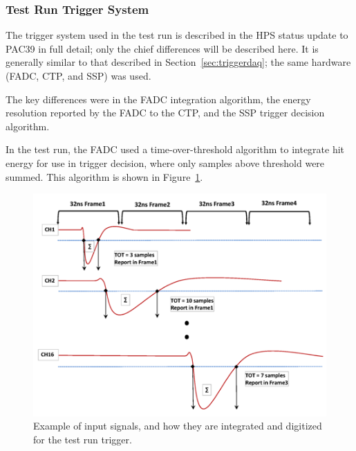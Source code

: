 \subsubsection{Test Run Trigger System}
\label{sec:testrun_trigger}
The trigger system used in the test run is described in the HPS status update to PAC39 \cite{HPS_PROP_UPD} in full detail; only the chief differences will be described here. 
It is generally similar to that described in Section~\ref{sec:triggerdaq}; the same hardware (FADC, CTP, and SSP) was used.

The key differences were in the FADC integration algorithm, the energy resolution reported by the FADC to the CTP, and the SSP trigger decision algorithm.

In the test run, the FADC used a time-over-threshold algorithm to integrate hit energy for use in trigger decision, where only samples above threshold were summed.
This algorithm is shown in Figure~\ref{fig:trigsamples}.

\begin{figure}[ht]
\includegraphics[scale=0.9]{test2012/trigger//trigger_pulse_samples}
\caption{\small{Example of input signals, and how they are integrated and digitized for the test run trigger.}}\label{fig:trigsamples}
\end{figure}

